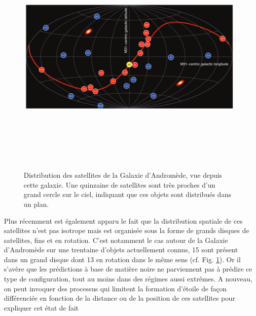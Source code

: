 \begin{figure}[htbp]
	\centering
		\includegraphics[height=12cm]{figs/planM31.png}
	\caption[Distribution des satellites de la Galaxie d'Andromède]{Distribution des satellites de la Galaxie d'Andromède, vue depuis cette galaxie. Une quinzaine de satellites sont très proches d'un grand cercle sur le ciel, indiquant que ces objets sont distribués dans un plan.} 
	\label{f:planM31}
\end{figure}

Plus récemment est également apparu le fait que la distribution spatiale de ces satellites n'est pas isotrope mais est organisée sous la forme de grands disques de satellites, fins et en rotation. C'est notamment le cas autour de la Galaxie d'Andromède sur une trentaine d'objets actuellement connus, 15 sont présent dans un grand disque dont 13 en rotation dans le même sens (cf. Fig. \ref{f:planM31}). Or il s'avère que les prédictions à base de matière noire ne parviennent pas à prédire ce type de configuration, tout au moins dans des régimes aussi extrêmes.  A nouveau, on peut invoquer des processus qui limitent la formation d'étoile de façon différenciée en fonction de la distance ou de la position de ces satellites pour expliquer cet état de fait 

